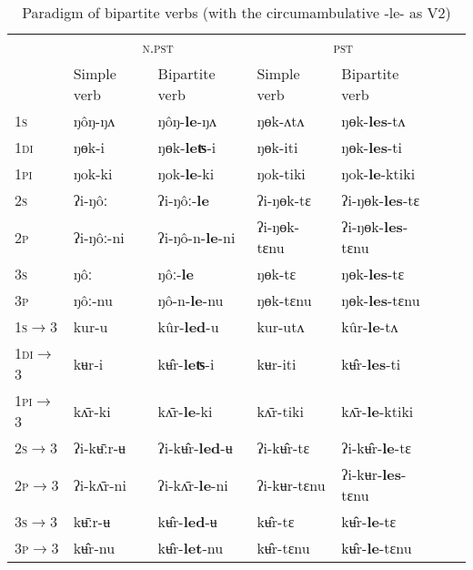 \documentclass[oneside,a4paper,11pt]{article}
\newcommand{\ipa}[1]{{\phon#1}}
\begin{document}

\begin{table}[H]
\caption{Paradigm of bipartite verbs (with the circumambulative \ipa{-le-} as V2)} \label{tab:kurledu}  \centering
\begin{tabular}{lllllll}
\toprule
&\multicolumn{2}{c}{\textsc{n.pst}} &  \multicolumn{2}{c}{\textsc{pst}} \\
&Simple verb &  Bipartite verb &  Simple verb&  Bipartite verb \\
\midrule
\textsc{1s} &  \ipa{ŋôŋ-ŋʌ} & \ipa{ŋôŋ-\textbf{le}-ŋʌ} & \ipa{ŋɵk-ʌtʌ} & \ipa{ŋɵk-\textbf{les}-tʌ} \\
\textsc{1di} &  \ipa{ŋɵk-i} & \ipa{ŋɵk-\textbf{leʦ}-i} & \ipa{ŋɵk-iti} & \ipa{ŋɵk-\textbf{les}-ti} \\
\textsc{1pi} &  \ipa{ŋok-ki} & \ipa{ŋok-\textbf{le}-ki} & \ipa{ŋok-tiki} & \ipa{ŋok-\textbf{le}-ktiki} \\
\textsc{2s} &  \ipa{ʔi-ŋôː} & \ipa{ʔi-ŋôː-\textbf{le}} & \ipa{ʔi-ŋɵk-tɛ} & \ipa{ʔi-ŋɵk-\textbf{les}-tɛ} \\
\textsc{2p} &  \ipa{ʔi-ŋôː-ni} & \ipa{ʔi-ŋô-n-\textbf{le}-ni} & \ipa{ʔi-ŋɵk-tɛnu} & \ipa{ʔi-ŋɵk-\textbf{les}-tɛnu}  \\
\textsc{3s} &  \ipa{ŋôː} & \ipa{ŋôː-\textbf{le}} & \ipa{ŋɵk-tɛ} & \ipa{ŋɵk-\textbf{les}-tɛ} \\
\textsc{3p} &  \ipa{ŋôː-nu} & \ipa{ŋô-n-\textbf{le}-nu} & \ipa{ŋɵk-tɛnu} & \ipa{ŋɵk-\textbf{les}-tɛnu} \\
\midrule
\textsc{1s$\rightarrow$3} &  \ipa{kur-u} & \ipa{kûr-\textbf{led}-u} & \ipa{kur-utʌ} & \ipa{kûr-\textbf{le}-tʌ} \\
\textsc{1di$\rightarrow$3} &  \ipa{kʉr-i} & \ipa{kʉ̂r-\textbf{leʦ}-i} & \ipa{kʉr-iti} & \ipa{kʉ̂r-\textbf{les}-ti} \\
\textsc{1pi$\rightarrow$3} &  \ipa{kʌ̄r-ki} & \ipa{kʌ̄r-\textbf{le}-ki} & \ipa{kʌ̄r-tiki} & \ipa{kʌ̄r-\textbf{le}-ktiki} \\
\textsc{2s$\rightarrow$3} &  \ipa{ʔi-kʉ̄ːr-ʉ} & \ipa{ʔi-kʉ̂r-\textbf{led}-ʉ} & \ipa{ʔi-kʉ̂r-tɛ} & \ipa{ʔi-kʉ̂r-\textbf{le}-tɛ} \\
\textsc{2p$\rightarrow$3} &  \ipa{ʔi-kʌ̄r-ni} & \ipa{ʔi-kʌ̄r-\textbf{le}-ni} & \ipa{ʔi-kʉr-tɛnu} & \ipa{ʔi-kʉr-\textbf{les}-tɛnu} \\
\textsc{3s$\rightarrow$3} &  \ipa{kʉ̄ːr-ʉ} & \ipa{kʉ̂r-\textbf{led}-ʉ} & \ipa{kʉ̂r-tɛ} & \ipa{kʉ̂r-\textbf{le}-tɛ} \\
\textsc{3p$\rightarrow$3} &  \ipa{kʉ̂r-nu} & \ipa{kʉ̂r-\textbf{let}-nu} & \ipa{kʉ̂r-tɛnu} & \ipa{kʉ̂r-\textbf{le}-tɛnu} \\
\bottomrule
\end{tabular}
\end{table}
  
\end{document}

